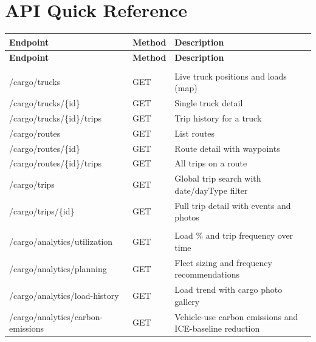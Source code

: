 \documentclass{article}
\begin{document}
\newpage

\section{API Quick Reference}

\begin{longtable}{>{\ttfamily\footnotesize}p{} p{} p{}}
\toprule
\textbf{Endpoint} & \textbf{Method} & \textbf{Description}\\
\midrule
\endfirsthead
\toprule
\textbf{Endpoint} & \textbf{Method} & \textbf{Description}\\
\midrule
\endhead
\bottomrule
\endfoot

\multicolumn{3}{l}{\textit{Fleet}}\\[2pt]
/cargo/trucks                            & GET & Live truck positions and loads (map)\\
/cargo/trucks/\{id\}                     & GET & Single truck detail\\
/cargo/trucks/\{id\}/trips               & GET & Trip history for a truck\\
/cargo/routes                            & GET & List routes\\
/cargo/routes/\{id\}                     & GET & Route detail with waypoints\\
/cargo/routes/\{id\}/trips               & GET & All trips on a route\\
/cargo/trips                             & GET & Global trip search with date/dayType filter\\
/cargo/trips/\{id\}                      & GET & Full trip detail with events and photos\\[4pt]

\multicolumn{3}{l}{\textit{Analytics}}\\[2pt]
/cargo/analytics/utilization             & GET & Load \% and trip frequency over time\\
/cargo/analytics/planning                & GET & Fleet sizing and frequency recommendations\\
/cargo/analytics/load-history            & GET & Load trend with cargo photo gallery\\
/cargo/analytics/carbon-emissions        & GET & Vehicle-use carbon emissions and ICE-baseline reduction\\[4pt]


\end{longtable}
\end{document}
